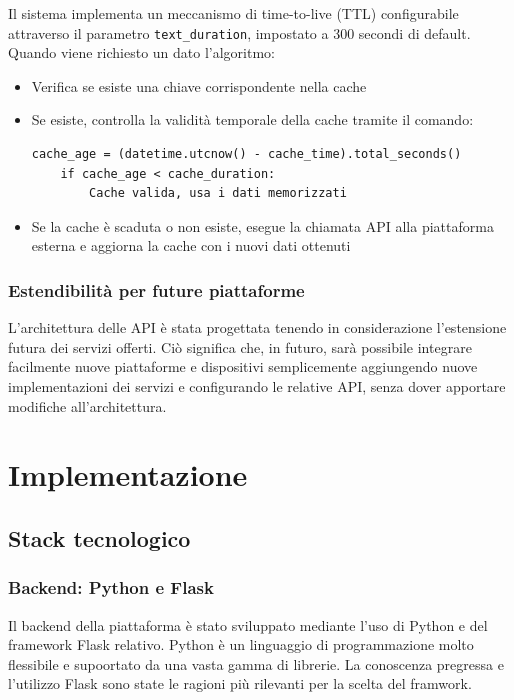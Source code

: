 \documentclass[12pt,a4paper,oneside]{report}
\begin{document}
Il sistema implementa un meccanismo di time-to-live (TTL) configurabile attraverso il parametro \texttt{text\_duration}, impostato a 300 secondi di default. Quando viene richiesto un dato l'algoritmo:
\begin{itemize}
    \item Verifica se esiste una chiave corrispondente nella cache
    \item Se esiste, controlla la validità temporale della cache tramite il comando:
          \begin{lstlisting}[basicstyle=\small\ttfamily, breaklines=true]
    cache_age = (datetime.utcnow() - cache_time).total_seconds()
    if cache_age < cache_duration:
        Cache valida, usa i dati memorizzati
    \end{lstlisting}
    \item Se la cache è scaduta o non esiste, esegue la chiamata API alla piattaforma esterna e aggiorna la cache con i nuovi dati ottenuti

\end{itemize}

\subsection{Estendibilità per future piattaforme}
L'architettura delle API è stata progettata tenendo in considerazione l'estensione futura dei servizi offerti. Ciò significa che, in futuro, sarà possibile integrare facilmente nuove piattaforme e dispositivi semplicemente aggiungendo nuove implementazioni dei servizi e configurando le relative API, senza dover apportare modifiche all'architettura.



\chapter{Implementazione}
\section{Stack tecnologico}
\subsection{Backend: Python e Flask}
Il backend della piattaforma è stato sviluppato mediante l'uso di Python e del framework Flask relativo. Python è un linguaggio di programmazione molto flessibile e supoortato da una vasta gamma di librerie. La conoscenza pregressa e l'utilizzo Flask sono state le ragioni più rilevanti per la scelta del framwork.
\end{document}
